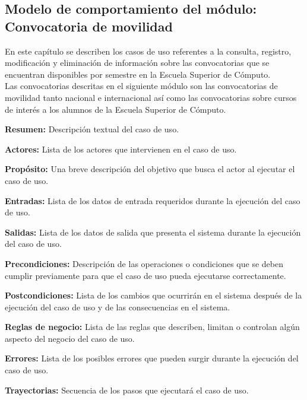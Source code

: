 \subsection{Modelo de comportamiento del módulo: Convocatoria de movilidad
	 \label{chp:modeloComportamientoMovilidad}}

En este capítulo se describen los casos de uso referentes a la consulta, registro, modificación y eliminación de información sobre las convocatorias que se encuentran disponibles por semestre en la Escuela Superior de Cómputo. \\
Las convocatorias descritas en el siguiente módulo son las convocatorias de movilidad tanto nacional e internacional así como las convocatorias sobre cursos de interés a los alumnos de la Escuela Superior de Cómputo.
\bigskip

\begin{objetivos}
	\item {\bf Resumen:} Descripción textual del caso de uso.
	\item {\bf Actores:} Lista de los actores que intervienen en el caso de uso.
	\item {\bf Propósito:} Una breve descripción del objetivo que busca el actor al ejecutar el caso de uso.
	\item {\bf Entradas:} Lista de los datos de entrada requeridos durante la ejecución del caso de uso.
	\item {\bf Salidas:} Lista de los datos de salida que presenta el sistema durante la ejecución del caso de uso.
	\item {\bf Precondiciones:} Descripción de las operaciones o condiciones que se deben cumplir previamente para que el caso de uso pueda ejecutarse correctamente.
	\item {\bf Postcondiciones:} Lista de los cambios que ocurrirán en el sistema después de la ejecución del caso de uso y de las consecuencias en el sistema.
	\item {\bf Reglas de negocio:} Lista de las reglas que describen, limitan o controlan algún aspecto del negocio del caso de uso.
	\item {\bf Errores:} Lista de los posibles errores que pueden surgir durante la ejecución del caso de uso.
	\item {\bf Trayectorias:} Secuencia de los pasos que ejecutará el caso de uso.
\end{objetivos}


